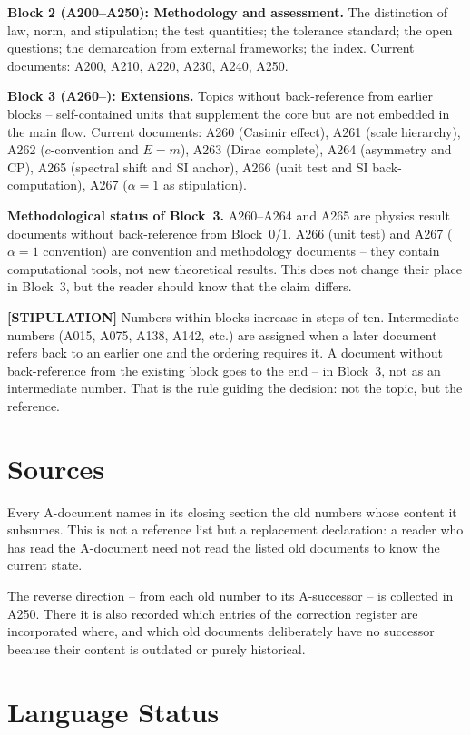 \textbf{Block 2 (A200--A250): Methodology and assessment.} The distinction
of law, norm, and stipulation; the test quantities; the tolerance standard;
the open questions; the demarcation from external frameworks; the index.
Current documents: A200, A210, A220, A230, A240, A250.

\textbf{Block 3 (A260--): Extensions.} Topics without back-reference from
earlier blocks -- self-contained units that supplement the core but are not
embedded in the main flow. Current documents: A260 (Casimir effect), A261
(scale hierarchy), A262 ($c$-convention and $E=m$), A263 (Dirac complete),
A264 (asymmetry and CP), A265 (spectral shift and SI anchor), A266 (unit
test and SI back-computation), A267 ($\alpha=1$ as stipulation).

\textbf{Methodological status of Block~3.} A260--A264 and A265 are physics
result documents without back-reference from Block~0/1. A266 (unit test)
and A267 ($\alpha=1$ convention) are convention and methodology documents --
they contain computational tools, not new theoretical results. This does not
change their place in Block~3, but the reader should know that the claim
differs.

\textbf{[STIPULATION]} Numbers within blocks increase in steps of ten.
Intermediate numbers (A015, A075, A138, A142, etc.) are assigned when a
later document refers back to an earlier one and the ordering requires it.
A document without back-reference from the existing block goes to the end --
in Block~3, not as an intermediate number. That is the rule guiding the
decision: not the topic, but the reference.

\section{Sources}

Every A-document names in its closing section the old numbers whose content
it subsumes. This is not a reference list but a replacement declaration:
a reader who has read the A-document need not read the listed old documents
to know the current state.

The reverse direction -- from each old number to its A-successor -- is
collected in A250. There it is also recorded which entries of the correction
register are incorporated where, and which old documents deliberately have
no successor because their content is outdated or purely historical.

\section{Language Status}

